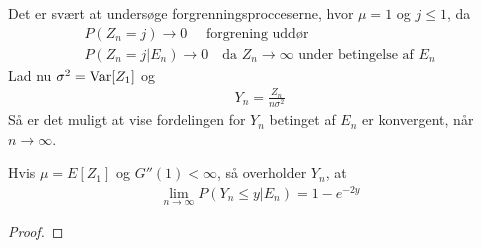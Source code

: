 Det er svært at undersøge forgrenningsprocceserne, hvor $\mu=1$ og $j\leq 1$, da
\begin{align}
    P(Z_n=j)\to 0 \quad \text{ forgrening uddør}
    \\
    P(Z_n=j |E_n) \to 0 \quad \text{da } Z_n\to\infty \text{ under betingelse af } E_n 
\end{align}
Lad nu $\sigma^2=\textnormal{Var}[Z_1]$ og  
\begin{align*}
Y_n=\frac{Z_n}{n\sigma^2}    
\end{align*}
Så er det muligt at vise fordelingen for $Y_n$ betinget af $E_n$ er konvergent, når $n\to\infty$.  

\begin{thm} \label{thm:thm6.7.8grim}
Hvis $\mu=E[Z_1]$ og $G''(1)<\infty$, så overholder $Y_n$, at
\begin{align*}
    \lim_{n\to\infty}P(Y_n\leq y|E_n) = 1-e^{-2y}
\end{align*}
\end{thm} 
\begin{proof}

\end{proof}
